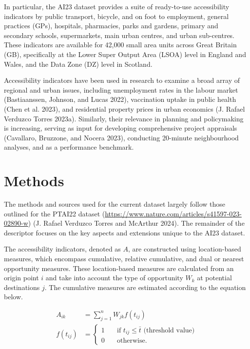\documentclass{article}
\begin{document}
In particular, the AI23 dataset provides a suite of ready-to-use
accessibility indicators by public transport, bicycle, and on foot to
employment, general practices (GPs), hospitals, pharmacies, parks and
gardens, primary and secondary schools, supermarkets, main urban
centres, and urban sub-centres. These indicators are available for
42,000 small area units across Great Britain (GB), specifically at the
Lower Super Output Area (LSOA) level in England and Wales, and the Data
Zone (DZ) level in Scotland.

Accessibility indicators have been used in research to examine a broad
array of regional and urban issues, including unemployment rates in the
labour market (Bastiaanssen, Johnson, and Lucas 2022), vaccination
uptake in public health (Chen et al. 2023), and residential property
prices in urban economics (J. Rafael Verduzco Torres 2023a). Similarly,
their relevance in planning and policymaking is increasing, serving as
input for developing comprehensive project appraisals (Cavallaro,
Bruzzone, and Nocera 2023), conducting 20-minute neighbourhood analyses,
and as a performance benchmark.

\hypertarget{methods}{%
\section{Methods}\label{methods}}

The methods and sources used for the current dataset largely follow
those outlined for the PTAI22 dataset
(\url{https://www.nature.com/articles/s41597-023-02890-w}) (J. Rafael
Verduzco Torres and McArthur 2024). The remainder of the descriptor
focuses on the key aspects and extensions unique to the AI23 dataset.

The accessibility indicators, denoted as \(A\), are constructed using
location-based measures, which encompass cumulative, relative
cumulative, and dual or nearest opportunity measures. These
location-based measures are calculated from an origin point \(i\) and
take into account the type of opportunity \(W_k\) at potential
destinations \(j\). The cumulative measures are estimated according to
the equation below.

\[
\begin{aligned}
A_{ik} &= \sum_{j=1}^{n} W_{jk} f(t_{ij}) \\
f(t_{ij}) &= \left\{
      \begin{array}{ll}
          1 & \quad \text{if }t_{ij} \leq \bar{t} \text{ (threshold value)} \\
          0 & \quad \text{otherwise}.
      \end{array}
    \right.
\end{aligned}
\]
\end{document}
